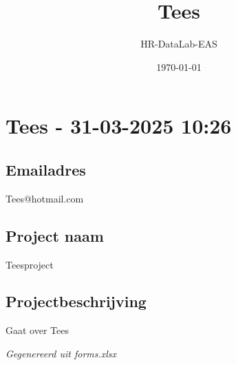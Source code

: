 \documentclass[a4paper,11pt]{article}
\title{Tees}
\author{HR-DataLab-EAS}
\date{\today}
\begin{document}
\maketitle

\section*{Tees - 31-03-2025 10:26}
\hrulefill


\subsection*{Emailadres}
Tees@hotmail.com


\subsection*{Project naam}
Teesproject


\subsection*{Projectbeschrijving}
Gaat over Tees


\hrulefill

\textit{Gegenereerd uit forms.xlsx}
\end{document}
